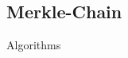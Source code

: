 \documentclass[../Bitcoin Blink.tex]{subfiles}
\begin{document}
\normalsize
\subsection{Merkle-Chain}
Algorithms
\end{document}
